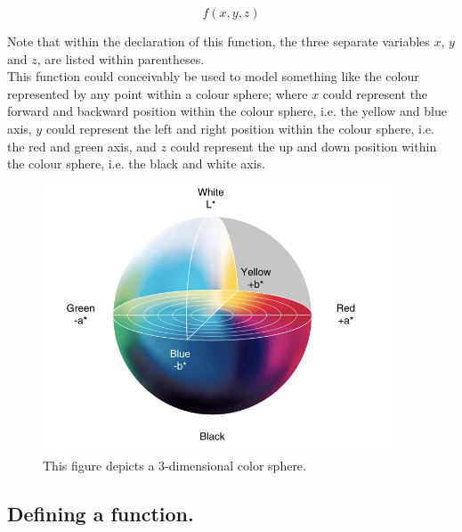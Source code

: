 \documentclass{article}
\begin{document}
\begin{equation*}
  f(x, y, z)
\end{equation*}

Note that within the declaration of this function, the three separate variables \begin{math} x\end{math}, 
\begin{math}y\end{math} and \begin{math} z\end{math}, are listed within parentheses.\\

This function could conceivably be used to model something like the colour represented by any point within a 
colour sphere; where \begin{math} x \end{math} could represent the forward and backward position within the
colour sphere, i.e. the yellow and blue axis, \begin{math} y \end{math} could represent the left and right position
within the colour sphere, i.e. the red and green axis, and \begin{math} z \end{math} could represent the up and down
position within the colour sphere, i.e. the black and white axis.

\newpage

\begin{figure}
  \includegraphics[scale=0.75]{images/Color_sphere.png}
  \caption{This figure depicts a 3-dimensional color sphere.}
  \label{fig:Color_sphere}
\end{figure}


\subsection{Defining a function.}
\end{document}
